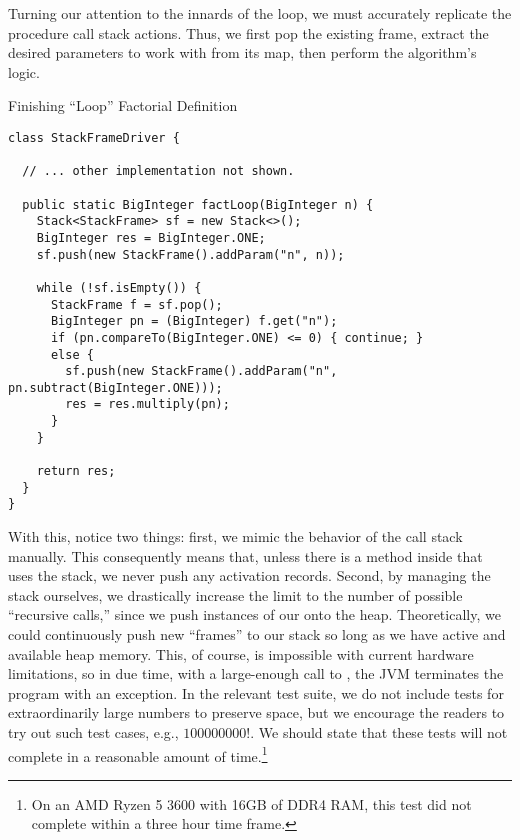 Turning our attention to the innards of the loop, we must accurately replicate the procedure call stack actions. Thus, we first pop the existing frame, extract the desired parameters to work with from its map, then perform the algorithm's logic.

\begin{cl}{Finishing ``Loop'' Factorial Definition}
\begin{lstlisting}[language=MyJava]
class StackFrameDriver {

  // ... other implementation not shown.

  public static BigInteger factLoop(BigInteger n) {
    Stack<StackFrame> sf = new Stack<>();
    BigInteger res = BigInteger.ONE;
    sf.push(new StackFrame().addParam("n", n));

    while (!sf.isEmpty()) {
      StackFrame f = sf.pop();
      BigInteger pn = (BigInteger) f.get("n");
      if (pn.compareTo(BigInteger.ONE) <= 0) { continue; }
      else {
        sf.push(new StackFrame().addParam("n", pn.subtract(BigInteger.ONE)));
        res = res.multiply(pn);
      }
    }

    return res;
  }
}
\end{lstlisting}
\end{cl}

With this, notice two things: first, we mimic the behavior of the call stack manually. This consequently means that, unless there is a method inside that uses the stack, we never push any activation records. Second, by managing the stack ourselves, we drastically increase the limit to the number of possible ``recursive calls,'' since we push instances of our  onto the heap. Theoretically, we could continuously push new ``frames'' to our stack so long as we have active and available heap memory. This, of course, is impossible with current hardware limitations, so in due time, with a large-enough call to , the JVM terminates the program with an  exception. In the relevant test suite, we do not include tests for extraordinarily large numbers to preserve space, but we encourage the readers to try out such test cases, e.g., $100000000!$. We should state that these tests will not complete in a reasonable amount of time.\footnote{On an AMD Ryzen 5 3600 with 16GB of DDR4 RAM, this test did not complete within a three hour time frame.} 